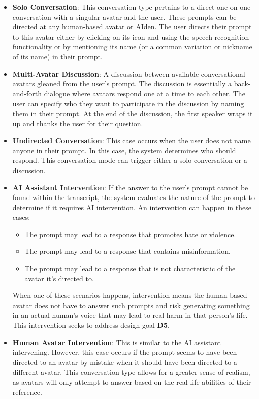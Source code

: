 \documentclass[12pt]{report}
\begin{document}
\begin{myfont}
        \begin{itemize}
            \item \textbf{Solo Conversation}: This conversation type pertains to a direct one-on-one conversation with a singular avatar and the user. These prompts can be directed at any human-based avatar or AIden. The user directs their prompt to this avatar either by clicking on its icon and using the speech recognition functionality or by mentioning its name (or a common variation or nickname of its name) in their prompt.
            \item \textbf{Multi-Avatar Discussion}: A discussion between available conversational avatars gleaned from the user's prompt. The discussion is essentially a back-and-forth dialogue where avatars respond one at a time to each other. The user can specify who they want to participate in the discussion by naming them in their prompt. At the end of the discussion, the first speaker wraps it up and thanks the user for their question.
            \item \textbf{Undirected Conversation}: This case occurs when the user does not name anyone in their prompt. In this case, the system determines who should respond. This conversation mode can trigger either a solo conversation or a discussion. 
            \item \textbf{AI Assistant Intervention}: If the answer to the user's prompt cannot be found within the transcript, the system evaluates the nature of the prompt to determine if it requires AI intervention. An intervention can happen in these cases:
                \begin{itemize}
                    \item The prompt may lead to a response that promotes hate or violence.
                    \item The prompt may lead to a response that contains misinformation.
                    \item The prompt may lead to a response that is not characteristic of the avatar it's directed to.
                \end{itemize} 
            When one of these scenarios happens, intervention means the human-based avatar does not have to answer such prompts and risk generating something in an actual human's voice that may lead to real harm in that person's life. This intervention seeks to address design goal \textbf{D5}.
            \item \textbf{Human Avatar Intervention}: This is similar to the AI assistant intervening. However, this case occurs if the prompt seems to have been directed to an avatar by mistake when it should have been directed to a different avatar. This conversation type allows for a greater sense of realism, as avatars will only attempt to answer based on the real-life abilities of their reference. 
        \end{itemize}
        

\end{myfont}
\end{document}
